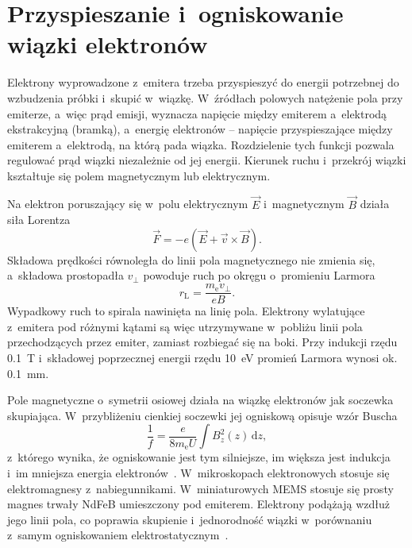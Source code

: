 \section{Przyspieszanie i~ogniskowanie wiązki elektronów}
\label{sec:wiazka}

\begin{zmiana}
Elektrony wyprowadzone z~emitera trzeba przyspieszyć do energii
potrzebnej do wzbudzenia próbki i~skupić w~wiązkę. W~źródłach polowych
natężenie pola przy emiterze, a~więc prąd emisji, wyznacza napięcie
między emiterem a~elektrodą ekstrakcyjną (bramką), a~energię elektronów
-- napięcie przyspieszające między emiterem a~elektrodą, na którą pada
wiązka. Rozdzielenie tych funkcji pozwala regulować prąd wiązki
niezależnie od jej energii. Kierunek ruchu i~przekrój wiązki kształtuje
się polem magnetycznym lub elektrycznym.
\end{zmiana}

Na elektron poruszający się w~polu elektrycznym $\vec{E}$ i~magnetycznym
$\vec{B}$ działa siła Lorentza
\begin{equation}
  \vec{F} = -e\left(\vec{E} + \vec{v}\times\vec{B}\right).
\end{equation}
Składowa prędkości równoległa do linii pola magnetycznego nie zmienia
się, a~składowa prostopadła $v_\perp$ powoduje ruch po okręgu
o~promieniu Larmora
\begin{equation}
  r_\mathrm{L} = \frac{m_\mathrm{e} v_\perp}{eB}.
\end{equation}
Wypadkowy ruch to spirala nawinięta na linię pola. Elektrony wylatujące
z~emitera pod różnymi kątami są więc utrzymywane w~pobliżu linii pola
przechodzących przez emiter, zamiast rozbiegać się na boki. Przy indukcji
rzędu \SI{0.1}{\tesla} i~składowej poprzecznej energii rzędu
\SI{10}{\electronvolt} promień Larmora wynosi ok.
\SI{0.1}{\milli\metre}.

Pole magnetyczne o~symetrii osiowej działa na wiązkę elektronów jak
soczewka skupiająca. W~przybliżeniu cienkiej soczewki jej ogniskową
opisuje wzór Buscha
\begin{equation}
  \frac{1}{f} = \frac{e}{8 m_\mathrm{e} U}\int B_z^2(z)\,\mathrm{d}z,
\end{equation}
z~którego wynika, że ogniskowanie jest tym silniejsze, im większa jest
indukcja i~im mniejsza energia elektronów~\cite{goldstein2018sem}.
W~mikroskopach elektronowych stosuje się elektromagnesy z~nabiegunnikami.
W~miniaturowych  MEMS stosuje się prosty magnes trwały NdFeB
umieszczony pod emiterem. Elektrony podążają wzdłuż jego linii pola, co
poprawia skupienie i~jednorodność wiązki w~porównaniu z~samym
ogniskowaniem elektrostatycznym~\cite{urbanski2026phd,grzebyk2017magnetic}.

